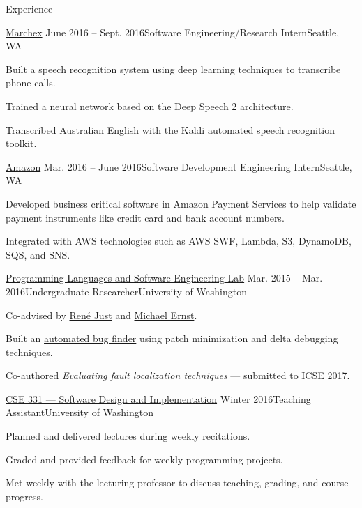 \documentclass{resume} %
\begin{document}

\begin{rSection}{Experience}

  \begin{rSubsection}{\href{http://www.marchex.com/}{Marchex}}
    {June 2016 -- Sept. 2016}{Software Engineering/Research Intern}{Seattle, WA}
  \item Built a speech recognition system using deep learning techniques to transcribe phone calls.
  \item Trained a neural network based on the Deep Speech 2 architecture.
  \item Transcribed Australian English with the Kaldi automated speech recognition toolkit.
  \end{rSubsection}

  \begin{rSubsection}{\href{https://www.amazon.com/}{Amazon}}
    {Mar. 2016 -- June 2016}{Software Development Engineering Intern}{Seattle, WA}
  \item Developed business critical software in Amazon Payment Services to help validate payment instruments like credit card and bank account numbers.
  \item Integrated with AWS technologies such as AWS SWF, Lambda, S3, DynamoDB, SQS, and SNS.
  \end{rSubsection}

  \begin{rSubsection}{\href{https://uwplse.org/}{Programming Languages and Software Engineering Lab}}
    {Mar. 2015 -- Mar. 2016}{Undergraduate Researcher}{University of Washington}
  \item Co-advised by \href{https://people.cs.umass.edu/~rjust/}{Ren{\'e} Just} and \href{https://homes.cs.washington.edu/~mernst/}{Michael Ernst}.
  \item Built an \href{https://github.com/dericp/patch-minimization}{automated bug finder} using patch minimization and delta debugging techniques.
  \item Co-authored \emph{Evaluating fault localization techniques} --- submitted to \href{http://icse2017.gatech.edu/}{ICSE 2017}.
  \end{rSubsection}
  
  \begin{rSubsection}{\href{https://courses.cs.washington.edu/courses/cse331/16wi/}{CSE 331 --- Software Design and Implementation}}
    {Winter 2016}{Teaching Assistant}{University of Washington}
  \item Planned and delivered lectures during weekly recitations.
  \item Graded and provided feedback for weekly programming projects.
  \item Met weekly with the lecturing professor to discuss teaching, grading, and course progress.
  \end{rSubsection}
  
\end{rSection}
\end{document}
